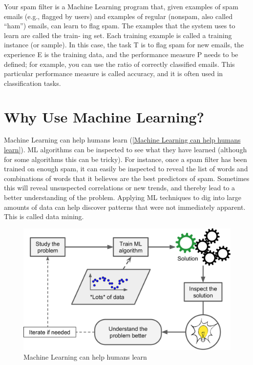 Your spam filter is a Machine Learning program that, given examples of spam emails
(e.g., flagged by users) and examples of regular (nonspam, also called “ham”) emails,
can learn to flag spam. The examples that the system uses to learn are called the train‐
ing set. Each training example is called a training instance (or sample). In this case, the
task T is to flag spam for new emails, the experience E is the training data, and the
performance measure P needs to be defined; for example, you can use the ratio of
correctly classified emails. This particular performance measure is called accuracy,
and it is often used in classification tasks.

\section{Why Use Machine Learning?}

Machine Learning can help humans learn (\autoref{Machine Learning can help humans learn}). ML algorithms can be
inspected to see what they have learned (although for some algorithms this can be
tricky). For instance, once a spam filter has been trained on enough spam, it can
easily be inspected to reveal the list of words and combinations of words that it
believes are the best predictors of spam. Sometimes this will reveal unsuspected correlations or new trends, and thereby lead to a better understanding of the problem. Applying ML techniques to dig into large amounts of data can help discover patterns that were not immediately apparent. This is called data mining.
\begin{figure}
\centering
\includegraphics{img/Machine Learning can help humans learn.png}
\caption{Machine Learning can help humans learn}
\label{Machine Learning can help humans learn}
\end{figure}

